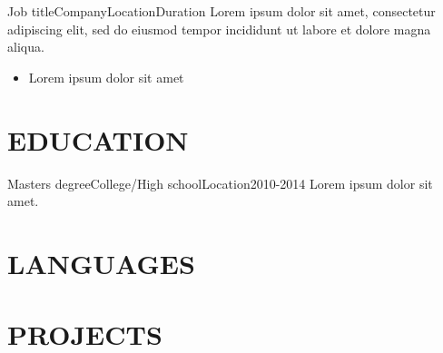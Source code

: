 \documentclass[10pt, a4paper]{article}
\begin{document}

\begin{cvitem}{Job title}{Company}{Location}{Duration}
Lorem ipsum dolor sit amet, consectetur adipiscing elit, sed do eiusmod tempor incididunt ut labore et dolore magna aliqua.
    \begin{itemize}
        \item Lorem ipsum dolor sit amet
    \end{itemize}
\end{cvitem}

\section{EDUCATION}


\begin{cvitem}{Masters degree}{College/High school}{Location}{2010-2014}
    Lorem ipsum dolor sit amet.
\end{cvitem}

\section{LANGUAGES}

\begin{langs}
     
\end{langs}

\cefrdesc %

\section{PROJECTS}
\end{document}
